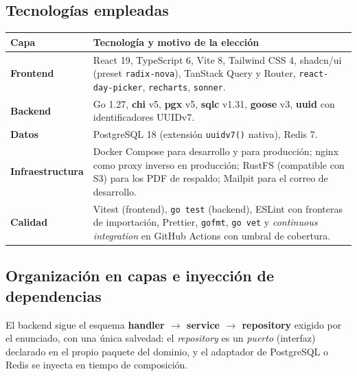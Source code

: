 \documentclass[11pt,a4paper]{article}
\newcommand{\ent}[1]{\textsf{\textbf{#1}}}
\newcommand{\code}[1]{\texttt{#1}}
\begin{document}
\subsection{Tecnolog\'ias empleadas}

\begin{tabularx}{\textwidth}{@{}>{\bfseries\color{upseAzul}}l X@{}}
\toprule
Capa & Tecnolog\'ia y motivo de la elecci\'on \\
\midrule
Frontend & React 19, TypeScript 6, Vite 8, Tailwind CSS 4, shadcn/ui (preset \code{radix-nova}), TanStack
Query y Router, \code{react-day-picker}, \code{recharts}, \code{sonner}. \\
Backend & Go 1.27, \ent{chi} v5, \ent{pgx} v5, \ent{sqlc} v1.31, \ent{goose} v3, \ent{uuid} con
identificadores UUIDv7. \\
Datos & PostgreSQL 18 (extensi\'on \code{uuidv7()} nativa), Redis 7. \\
Infraestructura & Docker Compose para desarrollo y para producci\'on; nginx como proxy inverso en
producci\'on; RustFS (compatible con S3) para los PDF de respaldo; Mailpit para el correo de
desarrollo. \\
Calidad & Vitest (frontend), \code{go test} (backend), ESLint con fronteras de importaci\'on, Prettier,
\code{gofmt}, \code{go vet} y \emph{continuous integration} en GitHub Actions con umbral de cobertura. \\
\bottomrule
\end{tabularx}

\subsection{Organizaci\'on en capas e inyecci\'on de dependencias}

El backend sigue el esquema \ent{handler $\rightarrow$ service $\rightarrow$ repository} exigido por el
enunciado, con una \'unica salvedad: el \emph{repository} es un \emph{puerto} (interfaz) declarado en el
propio paquete del dominio, y el adaptador de PostgreSQL o Redis se inyecta en tiempo de composici\'on.
\end{document}
